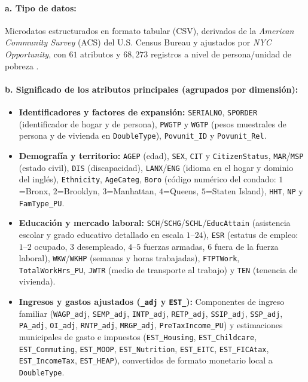 \documentclass[11pt,a4paper]{article}
\begin{document}
\paragraph{a. Tipo de datos:} Microdatos estructurados en formato tabular (CSV), derivados de la \textit{American Community Survey} (ACS) del U.S. Census Bureau y ajustados por \textit{NYC Opportunity}, con $61$ atributos y $68,273$ registros a nivel de persona/unidad de pobreza \cite{nyc_poverty_data_2018, acs_pums_dict_2018}.

\paragraph{b. Significado de los atributos principales (agrupados por dimensión):}
\begin{itemize}
    \item \textbf{Identificadores y factores de expansión:} \texttt{SERIALNO}, \texttt{SPORDER} (identificador de hogar y de persona), \texttt{PWGTP} y \texttt{WGTP} (pesos muestrales de persona y de vivienda en \texttt{DoubleType}), \texttt{Povunit\_ID} y \texttt{Povunit\_Rel}.
    \item \textbf{Demografía y territorio:} \texttt{AGEP} (edad), \texttt{SEX}, \texttt{CIT} y \texttt{CitizenStatus}, \texttt{MAR}/\texttt{MSP} (estado civil), \texttt{DIS} (discapacidad), \texttt{LANX}/\texttt{ENG} (idioma en el hogar y dominio del inglés), \texttt{Ethnicity}, \texttt{AgeCateg}, \texttt{Boro} (código numérico del condado: $1$=Bronx, $2$=Brooklyn, $3$=Manhattan, $4$=Queens, $5$=Staten Island), \texttt{HHT}, \texttt{NP} y \texttt{FamType\_PU}.
    \item \textbf{Educación y mercado laboral:} \texttt{SCH}/\texttt{SCHG}/\texttt{SCHL}/\texttt{EducAttain} (asistencia escolar y grado educativo detallado en escala $1\text{--}24$), \texttt{ESR} (estatus de empleo: $1\text{--}2$ ocupado, $3$ desempleado, $4\text{--}5$ fuerzas armadas, $6$ fuera de la fuerza laboral), \texttt{WKW}/\texttt{WKHP} (semanas y horas trabajadas), \texttt{FTPTWork}, \texttt{TotalWorkHrs\_PU}, \texttt{JWTR} (medio de transporte al trabajo) y \texttt{TEN} (tenencia de vivienda).
    \item \textbf{Ingresos y gastos ajustados (\texttt{\_adj} y \texttt{EST\_}):} Componentes de ingreso familiar (\texttt{WAGP\_adj}, \texttt{SEMP\_adj}, \texttt{INTP\_adj}, \texttt{RETP\_adj}, \texttt{SSIP\_adj}, \texttt{SSP\_adj}, \texttt{PA\_adj}, \texttt{OI\_adj}, \texttt{RNTP\_adj}, \texttt{MRGP\_adj}, \texttt{PreTaxIncome\_PU}) y estimaciones municipales de gasto e impuestos (\texttt{EST\_Housing}, \texttt{EST\_Childcare}, \texttt{EST\_Commuting}, \texttt{EST\_MOOP}, \texttt{EST\_Nutrition}, \texttt{EST\_EITC}, \texttt{EST\_FICAtax}, \texttt{EST\_IncomeTax}, \texttt{EST\_HEAP}), convertidos de formato monetario local a \texttt{DoubleType}.

\end{itemize}
\end{document}
